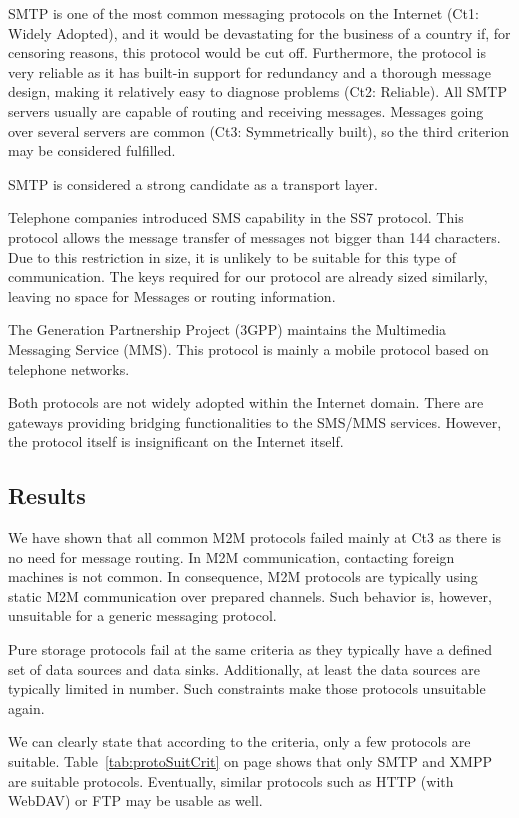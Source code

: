 SMTP is one of the most common messaging protocols on the Internet (Ct1: Widely Adopted), and it would be devastating for the business of a country if, for censoring reasons, this protocol would be cut off. Furthermore, the protocol is very reliable as it has built-in support for redundancy and a thorough message design, making it relatively easy to diagnose problems (Ct2: Reliable). All SMTP servers usually are capable of routing and receiving messages. Messages going over several servers are common (Ct3: Symmetrically built), so the third criterion may be considered fulfilled.

SMTP is considered a strong candidate as a transport layer.  

Telephone companies introduced SMS capability in the SS7 protocol. This protocol allows the message transfer of messages not bigger than 144 characters. Due to this restriction in size, it is unlikely to be suitable for this type of communication. The keys required for our protocol are already sized similarly, leaving no space for Messages or routing information.

The  Generation Partnership Project (3GPP) maintains the Multimedia Messaging Service (MMS). This protocol is mainly a mobile protocol based on telephone networks.

Both protocols are not widely adopted within the Internet domain. There are gateways providing bridging functionalities to the SMS/MMS services. However, the protocol itself is insignificant on the Internet itself. 

\subsection{Results}
We have shown that all common M2M protocols failed mainly at Ct3 as there is no need for message routing. In M2M communication, contacting foreign machines is not common. In consequence, M2M protocols are typically using static M2M communication over prepared channels. Such behavior is, however, unsuitable for a generic messaging protocol.

Pure storage protocols fail at the same criteria as they typically have a defined set of data sources and data sinks. Additionally, at least the data sources are typically limited in number. Such constraints make those protocols unsuitable again.

We can clearly state that according to the criteria, only a few protocols are suitable. Table~\ref{tab:protoSuitCrit} on page \pageref{tab:protoSuitCrit} shows that only SMTP and XMPP are suitable protocols. Eventually, similar protocols such as HTTP (with WebDAV) or FTP may be usable as well. 


